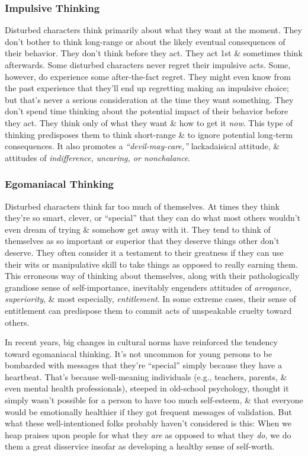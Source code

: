 \documentclass{article}
\numberwithin{equation}{section}
\begin{document}
\subsubsection{Impulsive Thinking}
Disturbed characters think primarily about what they want at the moment. They don't bother to think long-range or about the likely eventual consequences of their behavior. They don't think before they act. They act 1st \& sometimes think afterwards. Some disturbed characters never regret their impulsive acts. Some, however, do experience some after-the-fact regret. They might even know from the past experience that they'll end up regretting making an impulsive choice; but that's never a serious consideration at the time they want something. They don't spend time thinking about the potential impact of their behavior before they act. They think only of what they want \& how to get it \textit{now}. This type of thinking predisposes them to think short-range \& to ignore potential long-term consequences. It also promotes a \textit{``devil-may-care,''} lackadaisical attitude, \& attitudes of \textit{indifference, uncaring, or nonchalance}.

\subsubsection{Egomaniacal Thinking}
Disturbed characters think far too much of themselves. At times they think they're so smart, clever, or ``special'' that they can do what most others wouldn't even dream of trying \& somehow get away with it. They tend to think of themselves as so important or superior that they deserve things other don't deserve. They often consider it a testament to their greatness if they can use their wits or manipulative skill to take things as opposed to really earning them. This erroneous way of thinking about themselves, along with their pathologically grandiose sense of self-importance, inevitably engenders attitudes of \textit{arrogance, superiority}, \& most especially, \textit{entitlement}. In some extreme cases, their sense of entitlement can predispose them to commit acts of unspeakable cruelty toward others.

In recent years, big changes in cultural norms have reinforced the tendency toward egomaniacal thinking. It's not uncommon for young persons to be bombarded with messages that they're ``special'' simply because they have a heartbeat. That's because well-meaning individuals (e.g., teachers, parents, \& even mental health professionals), steeped in old-school psychology, thought it simply wasn't possible for a person to have too much self-esteem, \& that everyone would be emotionally healthier if they got frequent messages of validation. But what these well-intentioned folks probably haven't considered is this: When we heap praises upon people for what they \textit{are} as opposed to what they \textit{do}, we do them a great disservice insofar as developing a healthy sense of self-worth.
\end{document}
